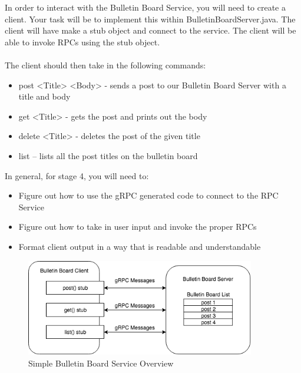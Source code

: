 \documentclass{article}
\begin{document}
In order to interact with the Bulletin Board Service, you will need to create a client. Your task will be to implement this within BulletinBoardServer.java. The client will have make a stub object and connect to the service. The client will be able to invoke RPCs using the stub object.\\\\
The client should then take in the following commands:
\begin{itemize}
\item post <Title> <Body> - sends a post to our Bulletin Board Server with a title and body
\item get <Title> - gets the post and prints out the body
\item delete <Title> - deletes the post of the given title
\item list – lists all the post titles on the bulletin board \\
\end{itemize}
In general, for stage 4, you will need to:
\begin{itemize}
\item Figure out how to use the gRPC generated code to connect to the RPC Service
\item Figure out how to take in user input and invoke the proper RPCs
\item Format client output in a way that is readable and understandable\\
\end{itemize}


\begin{figure}[h]
\includegraphics[width=10cm]{images/architecture}
\centering
\caption{Simple Bulletin Board Service Overview}
\end{figure}

\end{document}
